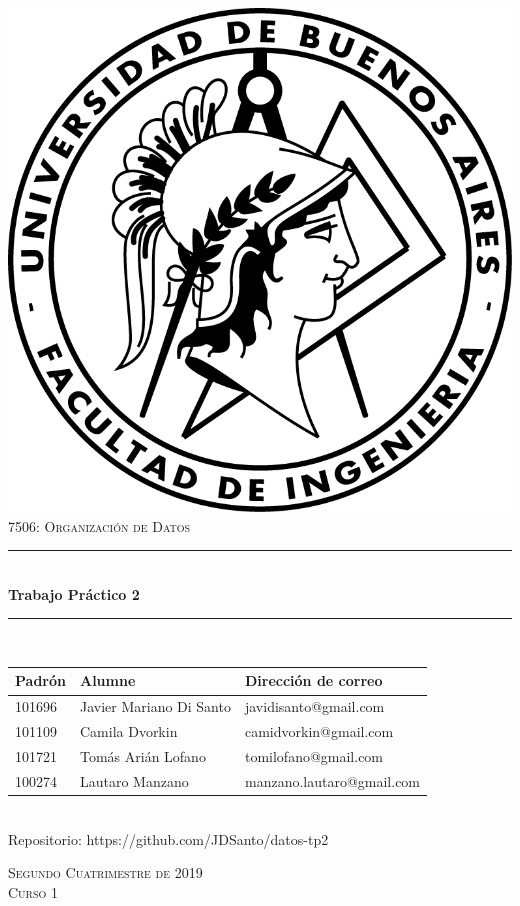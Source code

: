 \documentclass[12pt,a4paper]{article}
\newcommand{\thetitle}{Trabajo Práctico 2}
\newcommand{\thedate}{Segundo Cuatrimestre de 2019}
\begin{document}
\begin{titlepage}
\centering
\vspace*{2.5cm}

\includegraphics[scale = 1]{informe/logo_fiuba.png}\\[2.0 cm]

\textsc{\Large 7506: Organización de Datos}\\[0.7 cm]

\rule{0.94\linewidth}{0.2 mm} \\[0.4 cm]
{\huge \bfseries \thetitle}\\
\rule{0.94\linewidth}{0.2 mm} \\[1.2 cm]

\begin{tabular}{lll} %
    \toprule
    Padrón & Alumne & Dirección de correo \\
    \midrule
    101696 & Javier Mariano Di Santo & javidisanto@gmail.com \\
    101109 & Camila Dvorkin & camidvorkin@gmail.com \\
    101721 & Tomás Arián Lofano & tomilofano@gmail.com \\
    100274 & Lautaro Manzano & manzano.lautaro@gmail.com \\
    \bottomrule
\end{tabular}\\

\vspace*{1cm}
Repositorio: https://github.com/JDSanto/datos-tp2
\vspace*{1cm}

\textsc{\thedate \\[0.1 cm] Curso 1}

\end{titlepage}
\end{document}
